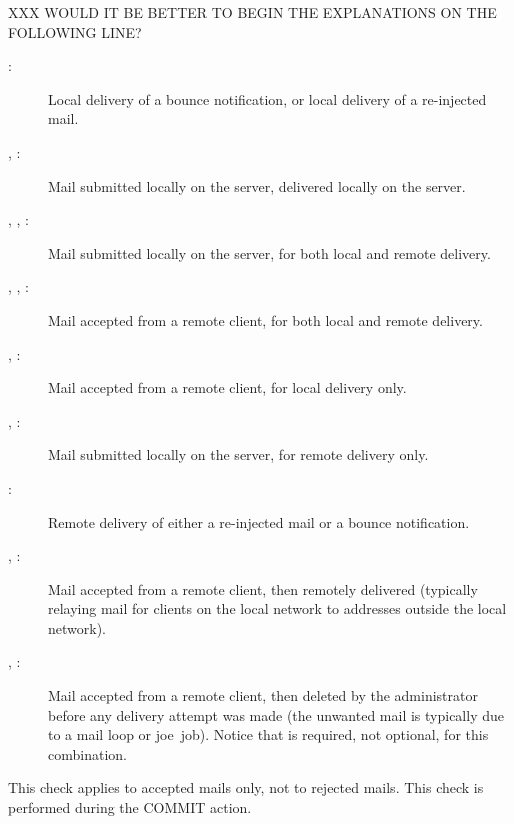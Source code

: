XXX WOULD IT BE BETTER TO BEGIN THE EXPLANATIONS ON THE FOLLOWING LINE\@?

\begin{description}

    \item [:] Local delivery of a bounce notification, or
        local delivery of a re-injected mail.

    \item [, :] Mail submitted locally on the
        server, delivered locally on the server.

    \item [, , :] Mail submitted
        locally \newline{} on the server, for both local and remote
        delivery.

    \item [, , :] Mail accepted
        from a remote client, for both local and remote delivery.

    \item [, :] Mail accepted from a remote
        client, for local delivery only.

    \item [, :] Mail submitted locally on the
        server, for remote delivery only.

    \item [:] Remote delivery of either a re-injected mail or
        a bounce notification.

    \item [, :] Mail accepted from a remote
        client, then remotely delivered (typically relaying mail for
        clients on the local network to addresses outside the local
        network).

    \item [, :] Mail accepted from a remote
        client, then deleted by the administrator before any delivery
        attempt was made (the unwanted mail is typically due to a mail loop
        or joe~job).  Notice that  is
        required, not optional, for this combination.

\end{description}

This check applies to accepted mails only, not to rejected mails.  This
check is performed during the COMMIT action.

